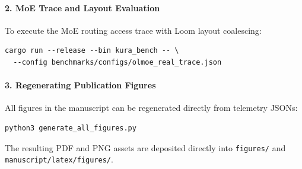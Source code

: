 \paragraph{2. MoE Trace and Layout Evaluation}
To execute the MoE routing access trace with Loom layout coalescing:
\begin{small}
\begin{verbatim}
cargo run --release --bin kura_bench -- \
  --config benchmarks/configs/olmoe_real_trace.json
\end{verbatim}
\end{small}

\paragraph{3. Regenerating Publication Figures}
All figures in the manuscript can be regenerated directly from telemetry JSONs:
\begin{small}
\begin{verbatim}
python3 generate_all_figures.py
\end{verbatim}
\end{small}
The resulting PDF and PNG assets are deposited directly into \texttt{figures/} and \texttt{manuscript/latex/figures/}.
